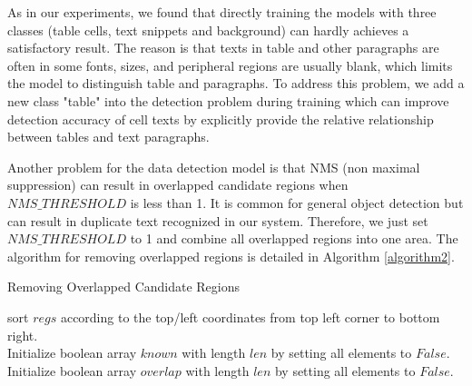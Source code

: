 \documentclass[sigconf]{acmart}
\begin{document}
As in our experiments, we found that directly training the models with three classes (table cells, text snippets and background) can hardly achieves a satisfactory result. The reason is that texts in table and other paragraphs are often in some fonts, sizes, and peripheral regions are usually blank, which limits the model to distinguish table and paragraphs. To address this problem, we add a new class "table" into the detection problem during training which can improve detection accuracy of cell texts by explicitly provide the relative relationship between tables and text paragraphs.

Another problem for the data detection model is that NMS (non maximal suppression) can result in overlapped candidate regions when $NMS\_THRESHOLD$ is less than 1. It is common for general object detection but can result in duplicate text recognized in our system. Therefore, we just set $NMS\_THRESHOLD$ to 1 and combine all overlapped regions into one area. The algorithm for removing overlapped regions is detailed in Algorithm \ref{algorithm2}.

\begin{algorithm}[htb]
	\caption{Removing Overlapped Candidate Regions}
	\label{algorithm2}
	\raggedright
	
	sort $regs$ according to the top/left coordinates from top left corner to bottom right.\\
	Initialize boolean array $known$ with length $len$ by setting all elements to $False$.\\
	Initialize boolean array $overlap$ with length $len$ by setting all elements to $False$.\\
	
\end{algorithm}
\end{document}

